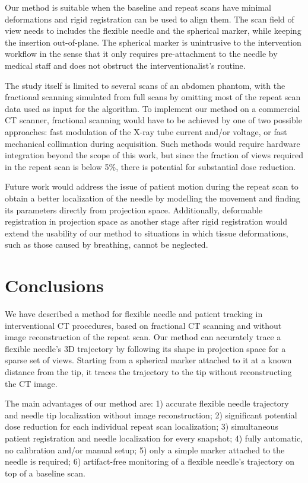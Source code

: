 Our method is suitable when the baseline and repeat scans have minimal deformations and rigid registration can be used to align them. The scan field of view needs to includes the flexible needle and the spherical marker, while keeping the insertion out-of-plane. The spherical marker is unintrusive to the intervention workflow in the sense that it only requires pre-attachment to the needle by medical staff and does not obstruct the interventionalist's routine.

The study itself is limited to several scans of an abdomen phantom, with the fractional scanning simulated from full scans by omitting most of the repeat scan data used as input for the algorithm. To implement our method on a commercial CT scanner, fractional scanning would have to be achieved by one of two possible approaches: fast modulation of the X-ray tube current and/or voltage, or fast mechanical collimation during acquisition. Such methods would require hardware integration beyond the scope of this work, but since the fraction of views required in the repeat scan is below 5\%, there is potential for substantial dose reduction.

Future work would address the issue of patient motion during the repeat scan to obtain a better localization of the needle by modelling the movement and finding its parameters directly from projection space. Additionally, deformable registration in projection space as another stage after rigid registration would extend the usability of our method to situations in which tissue deformations, such as those caused by breathing, cannot be neglected.

\section*{Conclusions}
We have described a method for flexible needle and patient tracking in interventional CT procedures, based on fractional CT scanning and without image reconstruction of the repeat scan.
Our method can accurately trace a flexible needle's 3D trajectory by following its shape in projection space for a sparse set of views. Starting from a spherical marker attached to it at a known distance from the tip, it traces the trajectory to the tip without reconstructing the CT image.

The main advantages of our method are:
1) accurate flexible needle trajectory and needle tip localization without image reconstruction;
2) significant potential dose reduction for each individual repeat scan localization;
3) simultaneous patient registration and needle localization for every snapshot; 
4) fully automatic, no calibration and/or manual setup;
5) only a simple marker attached to the needle is required; 
6) artifact-free monitoring of a flexible needle's trajectory on top of a baseline scan.

